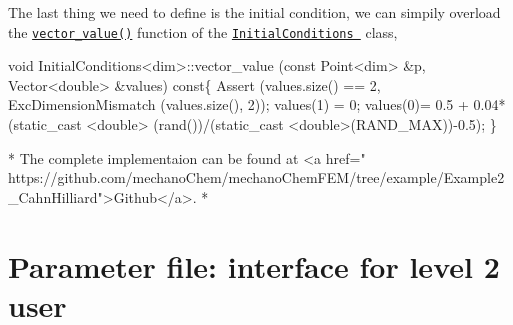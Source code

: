 The last thing we need to define is the initial condition, we can simpily overload the \href{../html/class_initial_conditions.html#aa10cfdd7350c3810a8deab707f397657}{\tt vector\-\_\-value()} function of the \href{../html/class_initial_conditions.html}{\tt Initial\-Conditions } class, 
\begin{DoxyCode}
\textcolor{keywordtype}{void} InitialConditions<dim>::vector_value (\textcolor{keyword}{const} Point<dim>   &p, Vector<double>   &values)\textcolor{keyword}{ const}\{
  Assert (values.size() == 2, ExcDimensionMismatch (values.size(), 2));
  values(1) = 0;    
 values(0)= 0.5 + 0.04*(static\_cast <\textcolor{keywordtype}{double}> (rand())/(static\_cast <double>(RAND\_MAX))-0.5);
\}

* The complete implementaion can be found at  <a href=\textcolor{stringliteral}{"
      https://github.com/mechanoChem/mechanoChemFEM/tree/example/Example2\_CahnHilliard"}>Github</a>. 
* 
\end{DoxyCode}
\hypertarget{growth_file}{}\section{Parameter file\-: interface for level 2 user}\label{growth_file}

